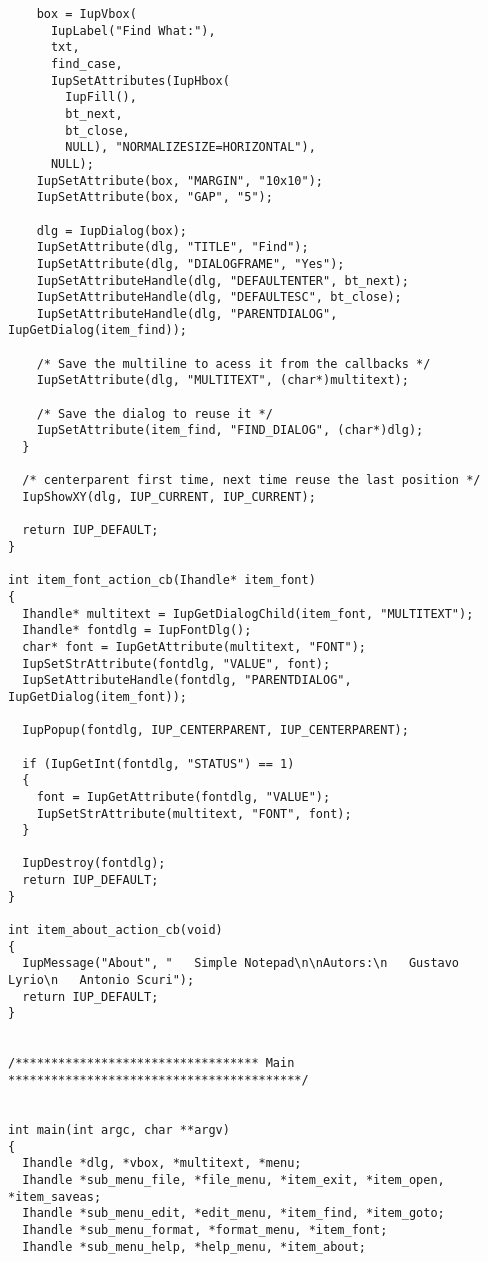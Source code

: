 \documentclass{ctexart}
\begin{document}
\begin{lstlisting}
    box = IupVbox(
      IupLabel("Find What:"),
      txt,
      find_case,
      IupSetAttributes(IupHbox(
        IupFill(),
        bt_next,
        bt_close,
        NULL), "NORMALIZESIZE=HORIZONTAL"),
      NULL);
    IupSetAttribute(box, "MARGIN", "10x10");
    IupSetAttribute(box, "GAP", "5");

    dlg = IupDialog(box);
    IupSetAttribute(dlg, "TITLE", "Find");
    IupSetAttribute(dlg, "DIALOGFRAME", "Yes");
    IupSetAttributeHandle(dlg, "DEFAULTENTER", bt_next);
    IupSetAttributeHandle(dlg, "DEFAULTESC", bt_close);
    IupSetAttributeHandle(dlg, "PARENTDIALOG", IupGetDialog(item_find));

    /* Save the multiline to acess it from the callbacks */
    IupSetAttribute(dlg, "MULTITEXT", (char*)multitext);

    /* Save the dialog to reuse it */
    IupSetAttribute(item_find, "FIND_DIALOG", (char*)dlg);
  }

  /* centerparent first time, next time reuse the last position */
  IupShowXY(dlg, IUP_CURRENT, IUP_CURRENT);

  return IUP_DEFAULT;
}

int item_font_action_cb(Ihandle* item_font)
{
  Ihandle* multitext = IupGetDialogChild(item_font, "MULTITEXT");
  Ihandle* fontdlg = IupFontDlg();
  char* font = IupGetAttribute(multitext, "FONT");
  IupSetStrAttribute(fontdlg, "VALUE", font);
  IupSetAttributeHandle(fontdlg, "PARENTDIALOG", IupGetDialog(item_font));

  IupPopup(fontdlg, IUP_CENTERPARENT, IUP_CENTERPARENT);

  if (IupGetInt(fontdlg, "STATUS") == 1)
  {
    font = IupGetAttribute(fontdlg, "VALUE");
    IupSetStrAttribute(multitext, "FONT", font);
  }

  IupDestroy(fontdlg);
  return IUP_DEFAULT;
}

int item_about_action_cb(void)
{
  IupMessage("About", "   Simple Notepad\n\nAutors:\n   Gustavo Lyrio\n   Antonio Scuri");
  return IUP_DEFAULT;
}


/********************************** Main *****************************************/


int main(int argc, char **argv)
{
  Ihandle *dlg, *vbox, *multitext, *menu;
  Ihandle *sub_menu_file, *file_menu, *item_exit, *item_open, *item_saveas;
  Ihandle *sub_menu_edit, *edit_menu, *item_find, *item_goto;
  Ihandle *sub_menu_format, *format_menu, *item_font;
  Ihandle *sub_menu_help, *help_menu, *item_about;


\end{lstlisting}
\end{document}
